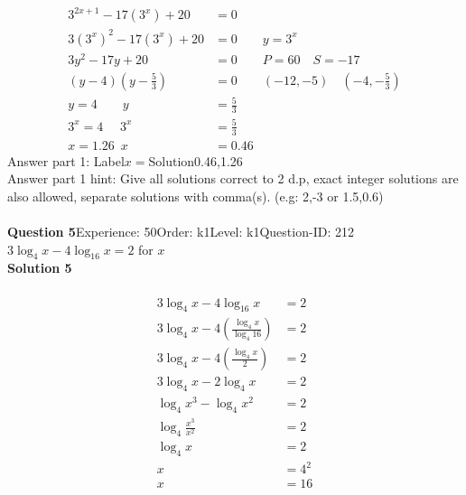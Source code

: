 \documentclass{article}
\begin{document}
\\[-35pt]\begin{align*}
3^{2x+1}-17(3^x)+20&=0\\[2pt]
3(3^x)^2-17(3^x)+20&=0\qquad y=3^x\\[2pt]
3y^2-17y+20&=0\qquad P=60 \quad S=-17\\[2pt]
(y-4)\left(y-\displaystyle\frac{5}{3}\right)&=0\qquad (-12,-5)\quad \left(-4,-\displaystyle\frac{5}{3}\right)\\[2pt]
y=4 \qquad y&=\displaystyle\frac{5}{3}\\[2pt]
3^x=4\hspace{16pt} 3^x&=\displaystyle\frac{5}{3}\\[2pt]
x=1.26 \hspace{6pt} x&=0.46
\end{align*}
Answer part 1: \hspace{10pt}Label\hspace{10pt}$x=$\hspace{10pt}Solution\hspace{10pt}0.46,1.26\\
Answer part 1 hint: \hspace{15pt} Give all solutions correct to 2 d.p, exact integer solutions are also allowed, separate solutions with comma(s). (e.g: 2,-3 or 1.5,0.6)\\
\\[4pt]
\noindent\textbf{Question 5}\hspace{20pt}Experience: 50\hspace{20pt}Order: k1\hspace{20pt}Level: k1\hspace{20pt}Question-ID: 212\\[2pt]
$3\log_{4}x-4\log_{16}x=2$ for $x$\\[4pt]
\noindent\textbf{Solution 5}\\[2pt]
\\[-35pt]\begin{align*}
3\log_{4}x-4\log_{16}x&=2\\[2pt]
3\log_{4}x-4\left(\displaystyle\frac{\log_{4}x}{\log_{4}16}\right)&=2\\[2pt]
3\log_{4}x-4\left(\displaystyle\frac{\log_{4}x}{2}\right)&=2\\[2pt]
3\log_{4}x-2\log_{4}x&=2\\[2pt]
\log_{4}x^3-\log_{4}x^2&=2\\[2pt]
\log_{4}\displaystyle\frac{x^3}{x^2}&=2\\[2pt]
\log_{4} x&=2\\[2pt]
x&=4^2\\[2pt]
x&=16
\end{align*}
\end{document}
